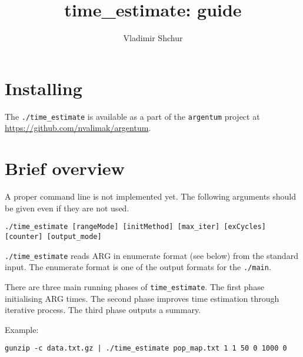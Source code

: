 \documentclass[11pt]{amsart}
\newcommand{\PBWT}{\mathcal{PBWT}}
\theoremstyle{definition}
\theoremstyle{remark}
\begin{document}
\title{time\_estimate: guide}
\author{Vladimir Shchur }
\address{vlshchur@gmail.com}
\maketitle





\section{Installing}
	The \texttt{./time\_estimate} is available as a part of the \texttt{argentum} project at \url{https://github.com/nvalimak/argentum}.

\section{Brief overview}

	A proper command line is not implemented yet. The following arguments should be given even if they are not used.
	\begin{displayquote}
		\texttt{./time\_estimate  [rangeMode] [initMethod] [max\_iter] [exCycles] [counter] [output\_mode]}
	\end{displayquote}

	\texttt{./time\_estimate} reads ARG in enumerate format (see below) from the standard input. The enumerate format is one of the output formats for the \texttt{./main}.

	There are three main running phases of \texttt{time\_estimate}. The first phase initialising ARG times. The second phase improves time estimation through iterative process. The third phase outputs a summary.

	Example:
	\begin{displayquote}
		\texttt{gunzip -c data.txt.gz | ./time\_estimate pop\_map.txt 1 1 50 0 1000 0}
	\end{displayquote}
\end{document}
